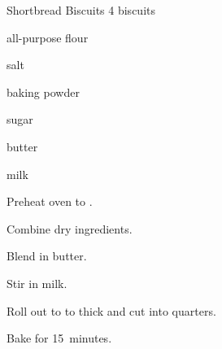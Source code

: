 \begin{recipe}{Shortbread Biscuits \UNTESTED}{}{4 biscuits}

\begin{ingredients}
\item {} all-purpose flour
\item \tp{\half} salt
\item {} baking powder
\item {} sugar
\item {} butter
\item \C{\half} milk
\end{ingredients}

\begin{directions}
\item Preheat oven to .
\item Combine dry ingredients.
\item Blend in butter.
\item Stir in milk.
\item Roll out to to  thick and cut into quarters.
\item Bake for 15~minutes.
\end{directions}
\end{recipe}
